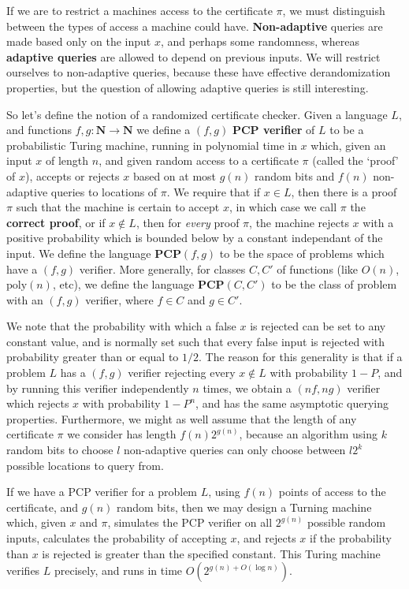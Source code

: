 If we are to restrict a machines access to the certificate $\pi$, we must distinguish between the types of access a machine could have. {\bf Non-adaptive} queries are made based only on the input $x$, and perhaps some randomness, whereas {\bf adaptive queries} are allowed to depend on previous inputs. We will restrict ourselves to non-adaptive queries, because these have effective derandomization properties, but the question of allowing adaptive queries is still interesting.

So let's define the notion of a randomized certificate checker. Given a language $L$, and functions $f,g: \mathbf{N} \to \mathbf{N}$ we define a $(f,g)$ {\bf PCP verifier} of $L$ to be a probabilistic Turing machine, running in polynomial time in $x$ which, given an input $x$ of length $n$, and given random access to a certificate $\pi$ (called the `proof' of $x$), accepts or rejects $x$ based on at most $g(n)$ random bits and $f(n)$ non-adaptive queries to locations of $\pi$. We require that if $x \in L$, then there is a proof $\pi$ such that the machine is certain to accept $x$, in which case we call $\pi$ the {\bf correct proof}, or if $x \not \in L$, then for {\it every} proof $\pi$, the machine rejects $x$ with a positive probability which is bounded below by a constant independant of the input. We define the language $\mathbf{PCP}(f,g)$ to be the space of problems which have a $(f,g)$ verifier. More generally, for classes $C, C'$ of functions (like $O(n)$, $\text{poly}(n)$, etc), we define the language $\mathbf{PCP}(C,C')$ to be the class of problem with an $(f,g)$ verifier, where $f \in C$ and $g \in C'$.

We note that the probability with which a false $x$ is rejected can be set to any constant value, and is normally set such that every false input is rejected with probability greater than or equal to $1/2$. The reason for this generality is that if a problem $L$ has a $(f,g)$ verifier rejecting every $x \not \in L$ with probability $1 - P$, and by running this verifier independently $n$ times, we obtain a $(nf,ng)$ verifier which rejects $x$ with probability $1 - P^n$, and has the same asymptotic querying properties. Furthermore, we might as well assume that the length of any certificate $\pi$ we consider has length $f(n)2^{g(n)}$, because an algorithm using $k$ random bits to choose $l$ non-adaptive queries can only choose between $l2^k$ possible locations to query from.

If we have a PCP verifier for a problem $L$, using $f(n)$ points of access to the certificate, and $g(n)$ random bits, then we may design a Turning machine which, given $x$ and $\pi$, simulates the PCP verifier on all $2^{g(n)}$ possible random inputs, calculates the probability of accepting $x$, and rejects $x$ if the probability than $x$ is rejected is greater than the specified constant. This Turing machine verifies $L$ precisely, and runs in time $O(2^{g(n) + O(\log n)})$.

